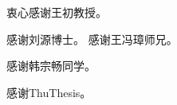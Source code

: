 
\begin{acknowledgements}
  衷心感谢王初教授。

  感谢刘源博士。
  感谢王冯璋师兄。
  
  感谢韩宗畅同学。

  感谢ThuThesis。

\end{acknowledgements}
